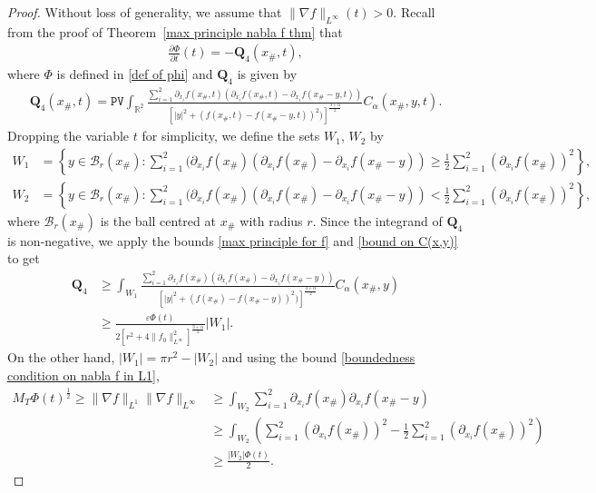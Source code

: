 \documentclass[reqno]{amsart}%
\theoremstyle{definition}
\theoremstyle{remark}
\numberwithin{equation}{section}
\newcommand{\0}{\mathbf{0}}
\newcommand{\1}{\mathbf{1}}
\newcommand{\R}{\mathbb R}
\newcommand{\PV}{\texttt{PV}}
\numberwithin{equation}{section}
\numberwithin{theorem}{section}
\numberwithin{figure}{section}
\begin{document}
\begin{proof}
Without loss of generality, we assume that $\|\nabla f\|_{L^\infty}(t)>0$. Recall from the proof of Theorem~\ref{max principle nabla f thm} that
\begin{align}\label{de for phi using Q4}
\frac{\partial\Phi}{\partial t}(t)=-\mathbf{Q}_4(x_{\#},t),
\end{align}
where $\Phi$ is defined in \eqref{def of phi} and $\mathbf{Q}_4$ is given by
\begin{align*}
\mathbf{Q}_4(x_{\#},t)=\PV\int_{\R^2}\frac{\sum_{i=1}^2\partial_{x_i}f(x_{\#},t)(\partial_{x_i}f(x_{\#},t)-\partial_{x_i}f(x_{\#}-y,t))}{[|y|^2+(f(x_{\#},t)-f(x_{\#}-y,t))^2)]^\frac{3+\alpha}{2}}C_{\alpha}(x_{\#},y,t).
\end{align*}
Dropping the variable $t$ for simplicity, we define the sets $W_1$, $W_2$ by
\begin{align*}
W_1 &= \left\{y\in \mathcal{B}_r(x_{\#}): \sum_{i=1}^2(\partial_{x_i}f(x_{\#})(\partial_{x_i}f(x_{\#}) - \partial_{x_i}f(x_{\#}-y)) \ge \frac{1}{2}\sum_{i=1}^2(\partial_{x_i}f(x_{\#}))^2\right\},\\
W_2 &= \left\{y\in \mathcal{B}_r(x_{\#}): \sum_{i=1}^2(\partial_{x_i}f(x_{\#})(\partial_{x_i}f(x_{\#}) - \partial_{x_i}f(x_{\#}-y)) < \frac{1}{2}\sum_{i=1}^2(\partial_{x_i}f(x_{\#}))^2\right\},
\end{align*}
where $\mathcal{B}_r(x_{\#})$ is the ball centred at $x_{\#}$ with radius $r$. Since the integrand of $\mathbf{Q}_4$ is non-negative, we apply the bounds \eqref{max principle for f} and \eqref{bound on C(x,y)} to get
\begin{align*}
\mathbf{Q}_4&\ge \int_{W_1}\frac{\sum_{i=1}^2\partial_{x_i}f(x_{\#})(\partial_{x_i}f(x_{\#})-\partial_{x_i}f(x_{\#}-y))}{[|y|^2+(f(x_{\#})-f(x_{\#}-y))^2)]^\frac{3+\alpha}{2}}C_{\alpha}(x_{\#},y)\\
&\ge\frac{\varepsilon\Phi(t)}{2[r^2+4\|f_0\|^2_{L^\infty}]^\frac{3+\alpha}{2}}|W_1|.
\end{align*}
On the other hand, $|W_1|=\pi r^2-|W_2|$ and using the bound \eqref{boundedness condition on nabla f in L1},
\begin{align*}
M_T\Phi(t)^\frac{1}{2}\ge\|\nabla f\|_{L^1}\|\nabla f\|_{L^\infty}&\ge\int_{W_2}\sum_{i=1}^2\partial_{x_i}f(x_{\#})\partial_{x_i}f(x_{\#}-y)\\
&\ge\int_{W_2}\left(\sum_{i=1}^2(\partial_{x_i}f(x_{\#}))^2-\frac{1}{2}\sum_{i=1}^2(\partial_{x_i}f(x_{\#}))^2\right)\\
&\ge\frac{|W_2|\Phi(t)}{2}.
\end{align*}

\end{proof}
\end{document}

